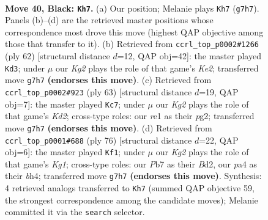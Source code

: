 \documentclass[11pt]{article}
\begin{document}
\clearpage

\begin{figure}[p]\centering
\begin{subfigure}{0.46\textwidth}\centering
\resizebox{\linewidth}{!}{%
\newchessgame
\chessboard[
  setfen={1r6/1p3pk1/p3p3/6K1/P3P3/5P1P/1R5P/4R3 b - - 10 40},
  showmover=false,
  pgfstyle=straightmove, color=movearrow, markmove={g7-h7}
]}
\caption{}
\end{subfigure}\hfill
\begin{subfigure}{0.46\textwidth}\centering
\resizebox{\linewidth}{!}{%
\newchessgame
\chessboard[
  setfen={8/2r3p1/8/p2k2p1/6Pp/2P4P/P3KP2/2R5 w - - 1 32},
  showmover=false,
  pgfstyle=straightmove, color=movearrow, markmove={e2-d3}
]}
\caption{}
\end{subfigure}
\\[4pt]
\begin{subfigure}{0.46\textwidth}\centering
\resizebox{\linewidth}{!}{%
\newchessgame
\chessboard[
  setfen={r7/3kpp1p/6p1/p2K4/R1P5/4P2P/5PP1/8 b - - 9 32},
  showmover=false,
  pgfstyle=straightmove, color=movearrow, markmove={d7-c7}
]}
\caption{}
\end{subfigure}\hfill
\begin{subfigure}{0.46\textwidth}\centering
\resizebox{\linewidth}{!}{%
\newchessgame
\chessboard[
  setfen={8/r1p5/P2p4/2pP1k1p/2P4b/8/R2B3P/6K1 w - - 1 39},
  showmover=false,
  pgfstyle=straightmove, color=movearrow, markmove={g1-f1}
]}
\caption{}
\end{subfigure}
\caption{\textbf{Move 40, Black: \texttt{Kh7}.} (a) Our position; Melanie plays \texttt{Kh7} (\texttt{g7h7}). Panels (b)--(d) are the retrieved master positions whose correspondence most drove this move (highest QAP objective among those that transfer to it). (b) Retrieved from \texttt{ccrl\_top\_p0002\#1266} (ply 62) [structural distance $d$=12, QAP obj=42]: the master played \texttt{Kd3}; under $\mu$ our \emph{Kg2} plays the role of that game's \emph{Ke2}; transferred move \texttt{g7h7} \textbf{(endorses this move)}. (c) Retrieved from \texttt{ccrl\_top\_p0002\#923} (ply 63) [structural distance $d$=19, QAP obj=7]: the master played \texttt{Kc7}; under $\mu$ our \emph{Kg2} plays the role of that game's \emph{Kd2}; cross-type roles: our \emph{r}e1 as their \emph{p}g2; transferred move \texttt{g7h7} \textbf{(endorses this move)}. (d) Retrieved from \texttt{ccrl\_top\_p0001\#688} (ply 76) [structural distance $d$=22, QAP obj=6]: the master played \texttt{Kf1}; under $\mu$ our \emph{Kg2} plays the role of that game's \emph{Kg1}; cross-type roles: our \emph{P}b7 as their \emph{B}d2, our \emph{p}a4 as their \emph{b}h4; transferred move \texttt{g7h7} \textbf{(endorses this move)}. Synthesis: 4 retrieved analogs transferred to \texttt{Kh7} (summed QAP objective 59, the strongest correspondence among the candidate moves); Melanie committed it via the \texttt{search} selector.}
\label{fig:thought-m79}
\end{figure}
\end{document}
